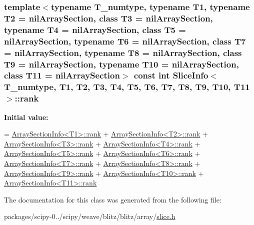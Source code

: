 \subsubsection[{rank}]{\setlength{\rightskip}{0pt plus 5cm}template$<$typename T\+\_\+numtype, typename T1, typename T2 = nil\+Array\+Section, class T3  = nil\+Array\+Section, typename T4  = nil\+Array\+Section, class T5  = nil\+Array\+Section, typename T6  = nil\+Array\+Section, class T7  = nil\+Array\+Section, typename T8  = nil\+Array\+Section, class T9  = nil\+Array\+Section, typename T10  = nil\+Array\+Section, class T11  = nil\+Array\+Section$>$ const int {\bf Slice\+Info}$<$ T\+\_\+numtype, T1, T2, T3, T4, T5, T6, T7, T8, T9, T10, T11 $>$\+::rank\hspace{0.3cm}{\ttfamily [static]}}\label{classSliceInfo_ae103c298c90e60cea21b2f01b088d374}
{\bfseries Initial value\+:}
\begin{DoxyCode}
= \hyperlink{classArraySectionInfo}{ArraySectionInfo<T1>::rank}
                      + \hyperlink{classArraySectionInfo}{ArraySectionInfo<T2>::rank}
                      + \hyperlink{classArraySectionInfo}{ArraySectionInfo<T3>::rank}
                      + \hyperlink{classArraySectionInfo}{ArraySectionInfo<T4>::rank}
                      + \hyperlink{classArraySectionInfo}{ArraySectionInfo<T5>::rank}
                      + \hyperlink{classArraySectionInfo}{ArraySectionInfo<T6>::rank}
                      + \hyperlink{classArraySectionInfo}{ArraySectionInfo<T7>::rank}
                      + \hyperlink{classArraySectionInfo}{ArraySectionInfo<T8>::rank}
                      + \hyperlink{classArraySectionInfo}{ArraySectionInfo<T9>::rank}
                      + \hyperlink{classArraySectionInfo}{ArraySectionInfo<T10>::rank}
                      + \hyperlink{classArraySectionInfo}{ArraySectionInfo<T11>::rank}
\end{DoxyCode}


The documentation for this class was generated from the following file\+:\begin{DoxyCompactItemize}
\item 
packages/scipy-\/0../scipy/weave/blitz/blitz/array/\hyperlink{slice_8h}{slice.\+h}\end{DoxyCompactItemize}

